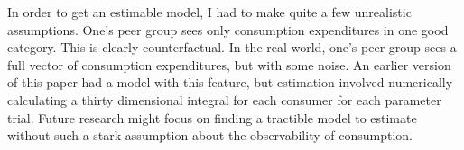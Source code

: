 \documentclass[12pt]{article}
\begin{document}
In order to get an estimable model, I had to make quite a few unrealistic assumptions.
One's peer group sees only consumption expenditures in one good category. 
This is clearly counterfactual.
In the real world, one's peer group sees a full vector of consumption expenditures, but with some noise.
An earlier version of this paper had a model with this feature, but estimation involved numerically calculating a thirty dimensional integral for each consumer for each parameter trial.
Future research might focus on finding a tractible model to estimate without such a stark assumption about the observability of consumption.


\end{document}

